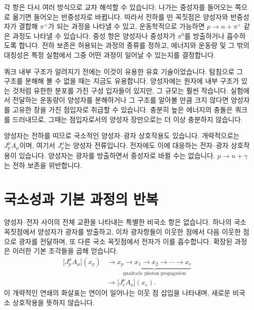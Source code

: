 각 항은 다시 여러 방식으로 교차 해석할 수 있습니다. 나가는 중성자를 들어오는 쪽으로 옮기면 들어오는 반중성자로 바뀝니다. 따라서 전하를 띤 꼭짓점은 양성자와 반중성자가 결합해 \(\pi^+\)가 되는 과정을 나타낼 수 있고, 운동학적으로 가능하면 \(p\to n+\pi^+\) 같은 과정도 나타낼 수 있습니다. 중성 항은 양성자나 중성자가 \(\pi^0\)를 방출하거나 흡수하도록 합니다. 전하 보존은 허용되는 과정의 종류를 정하고, 에너지와 운동량 및 그 밖의 대칭성은 특정 실험에서 그중 어떤 과정이 일어날 수 있는지를 결정합니다.

쿼크 내부 구조가 알려지기 전에는 이것이 유용한 유효 기술이었습니다. 탐침으로 그 구조를 분해해 볼 수 없을 때는 지금도 유용합니다. 양성자에는 원자에 내부 구조가 있는 것처럼 유한한 분포를 가진 구성 입자들이 있지만, 그 규모는 훨씬 작습니다. 실험에서 전달하는 운동량이 양성자를 분해하거나 그 구조를 알아볼 만큼 크지 않다면 양성자를 고유한 장을 가진 점입자로 취급할 수 있습니다. 충분히 높은 에너지의 충돌은 쿼크를 드러내므로, 그때는 점입자로서의 양성자 장만으로는 더 이상 충분하지 않습니다.

양성자는 전하를 띠므로 국소적인 양성자--광자 상호작용도 있습니다. 개략적으로는 \(J_p^\mu A_\mu\)이며, 여기서 \(J_p^\mu\)는 양성자 전류입니다. 전자에도 이에 대응하는 전자--광자 상호작용이 있습니다. 양성자는 광자를 방출하면서 중성자로 바뀔 수는 없습니다. \(p\to n+\gamma\)는 전하 보존을 위반합니다.

\begin{classroomqa}
\end{classroomqa}

\section{국소성과 기본 과정의 반복}

양성자--전자 사이의 전체 교환을 나타내는 특별한 비국소 항은 없습니다. 하나의 국소 꼭짓점에서 양성자가 광자를 방출하고, 이차 광자항들이 이웃한 점에서 다음 이웃한 점으로 광자를 전달하며, 또 다른 국소 꼭짓점에서 전자가 이를 흡수합니다. 확장된 과정은 이러한 기본 조각들을 곱해 얻습니다.
\begin{equation}
\begin{aligned}
\bigl[J_p^\mu A_\mu\bigr](x_p)
&\longrightarrow
\underbrace{x_p\to x_1\to x_2\to\cdots\to x_e}_{\text{quadratic photon propagation}}
\\
&\longrightarrow
\bigl[J_e^\nu A_\nu\bigr](x_e).
\end{aligned}
\end{equation}
이 개략적인 연쇄의 화살표는 연이어 일어나는 이웃 점 삽입을 나타내며, 새로운 비국소 상호작용을 뜻하지 않습니다.

